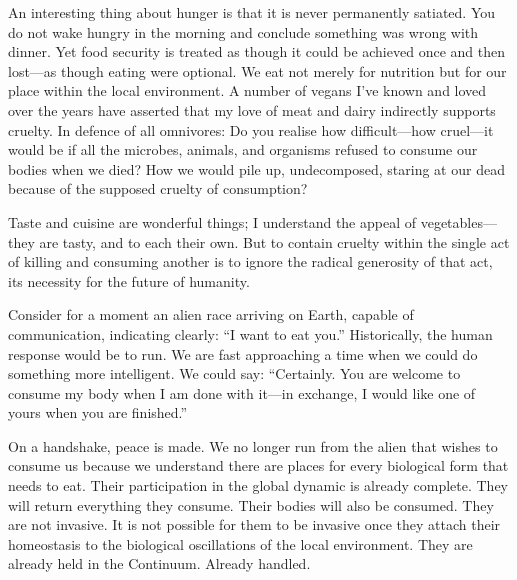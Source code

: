 An interesting thing about hunger is that it is never permanently satiated. You do not wake hungry in the morning and conclude something was wrong with dinner. Yet food security is treated as though it could be achieved once and then lost—as though eating were optional. We eat not merely for nutrition but for our place within the local environment. A number of vegans I’ve known and loved over the years have asserted that my love of meat and dairy indirectly supports cruelty. In defence of all omnivores: Do you realise how difficult—how cruel—it would be if all the microbes, animals, and organisms refused to consume our bodies when we died? How we would pile up, undecomposed, staring at our dead because of the supposed cruelty of consumption?

Taste and cuisine are wonderful things; I understand the appeal of vegetables—they are tasty, and to each their own. But to contain cruelty within the single act of killing and consuming another is to ignore the radical generosity of that act, its necessity for the future of humanity.

Consider for a moment an alien race arriving on Earth, capable of communication, indicating clearly: “I want to eat you.” Historically, the human response would be to run. We are fast approaching a time when we could do something more intelligent. We could say: “Certainly. You are welcome to consume my body when I am done with it—in exchange, I would like one of yours when you are finished.”

On a handshake, peace is made. We no longer run from the alien that wishes to consume us because we understand there are places for every biological form that needs to eat. Their participation in the global dynamic is already complete. They will return everything they consume. Their bodies will also be consumed. They are not invasive. It is not possible for them to be invasive once they attach their homeostasis to the biological oscillations of the local environment. They are already held in the Continuum. Already handled.

